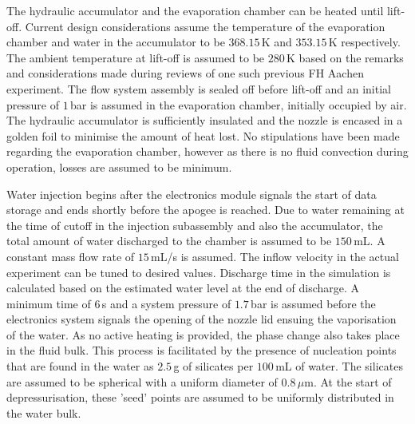 The hydraulic accumulator and the evaporation chamber can be heated until lift-off. Current design considerations 
 assume the temperature of the evaporation chamber and water in the accumulator to be $368.15$\,\si{K} and $353.15$\,\si{K} respectively. 
 The ambient temperature at lift-off is assumed to be $280$\,\si{K} based on the remarks and considerations made during reviews of one such previous FH Aachen experiment.
 The flow system assembly is sealed off before lift-off and an initial pressure of $1$\,\si{bar} is assumed in the evaporation chamber, initially 
 occupied by air. The hydraulic accumulator is sufficiently insulated and the nozzle is encased in a golden foil to minimise the amount of 
 heat lost. No stipulations have been made regarding the evaporation chamber, however as there is no fluid convection
 during operation, losses are assumed to be minimum. 


Water injection begins after the electronics module signals the start of data storage and ends shortly before the apogee is reached. 
 Due to water remaining at the time of cutoff in the injection subassembly and also the accumulator, the total amount of water discharged to 
 the chamber is assumed to be $150$\,\si{mL}. A constant mass flow rate of $15$\,\si{mL/s} is assumed. The inflow velocity in the actual experiment can be tuned to 
 desired values. Discharge time in the simulation is calculated based on the estimated water level at the end of discharge.
 A minimum time of $6$\,\si{s} and a system pressure
 of $1.7$\,\si{bar} is assumed before the electronics system signals the opening of the nozzle lid ensuing the vaporisation of the water.
 As no active heating is provided, the phase change also takes place in the fluid bulk. This process is facilitated by the presence 
 of nucleation points that are found in the water as $2.5$\,\si{g} of silicates per $100$\,\si{mL} of water. The silicates are assumed to be spherical 
 with a uniform diameter of $0.8\,\mu$\si{m}. At the start of depressurisation, these 'seed' points are assumed to be uniformly
 distributed in the water bulk.


